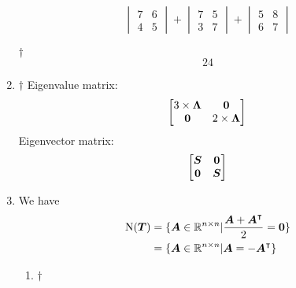 \documentclass[a4paper,12pt]{article}
\begin{document}
\begin{enumerate}
\begin{equation}
\begin{aligned}
\begin{vmatrix}
                7 & 6 \\
                4 & 5
            \end{vmatrix} + \begin{vmatrix}
                7 & 5 \\
                3 & 7
            \end{vmatrix} + \begin{vmatrix}
                5 & 8 \\
                6 & 7
            \end{vmatrix}
        \end{aligned}
    \end{equation}
    \begin{answer}{$\dag$}\begin{equation}
            24
        \end{equation} 
    \end{answer}
    \item \begin{answer}{$\dag$} Eigenvalue matrix: \begin{equation}
            \begin{bmatrix}
                3 \times \boldsymbol{\Lambda} & \boldsymbol{0} \\
                \boldsymbol{0} & 2 \times \boldsymbol{\Lambda}
            \end{bmatrix}
        \end{equation} Eigenvector matrix: \begin{equation}
            \begin{bmatrix}
                \boldsymbol{S} & \boldsymbol{0} \\
                \boldsymbol{0} & \boldsymbol{S}
            \end{bmatrix}
        \end{equation} 
    \end{answer}
    \item We have \begin{equation}
        \begin{aligned}
            \operatorname{N}(\boldsymbol{T}) & = \{\boldsymbol{A} \in \mathbb{R}^{n \times n} | \frac{\boldsymbol{A} + \boldsymbol{A}^\intercal}{2} = \boldsymbol{0}\} \\
            & = \{\boldsymbol{A} \in \mathbb{R}^{n \times n} | \boldsymbol{A} = -\boldsymbol{A}^\intercal\}
        \end{aligned}
    \end{equation}
    \begin{enumerate}[label=(\alph*)]
        \item \begin{answer}{$\dag$}\begin{equation}

\end{equation}
\end{answer}
\end{enumerate}
\end{enumerate}
\end{document}
